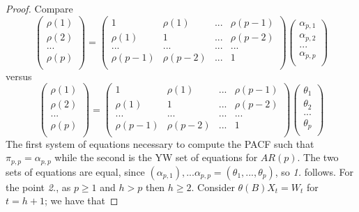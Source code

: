 \begin{proof}
    Compare
    \[
        \begin{pmatrix}
            \rho(1)\\
            \rho(2)\\
            ...\\
            \rho(p)\\
        \end{pmatrix}
        =
        \begin{pmatrix}
            1&\rho(1)&...&\rho(p-1)\\
            \rho(1)&1&...&\rho(p-2)\\
            ...&...&...&...\\
            \rho(p-1)&\rho(p-2)&...&1\\
        \end{pmatrix}  
        \begin{pmatrix}
            \alpha_{p,1}\\
            \alpha_{p,2}\\
            ...\\
            \alpha_{p,p}\\
        \end{pmatrix}
    \]
    versus
    \[
        \begin{pmatrix}
            \rho(1)\\
            \rho(2)\\
            ...\\
            \rho(p)\\
        \end{pmatrix}
        =
        \begin{pmatrix}
            1&\rho(1)&...&\rho(p-1)\\
            \rho(1)&1&...&\rho(p-2)\\
            ...&...&...&...\\
            \rho(p-1)&\rho(p-2)&...&1\\
        \end{pmatrix}  
        \begin{pmatrix}
            \theta_1\\
            \theta_2\\
            ...\\
            \theta_p\\
        \end{pmatrix}
    \]
    The first system of equations necessary to compute the PACF such that $\pi_{p,p}=\alpha_{p,p}$ while the second is the YW set of equations for $AR(p)$. The two sets of equations are equal, since $(\alpha_{p,1}),...\alpha_{p,p}=(\theta_1,...,\theta_p)$, so \textit{1.} follows. For the point \textit{2.}, as $p\ge1$ and $h>p$ then $h\ge2$. Consider $\theta(B)X_t=W_t$ for $t=h+1$; we have that

\end{proof}
